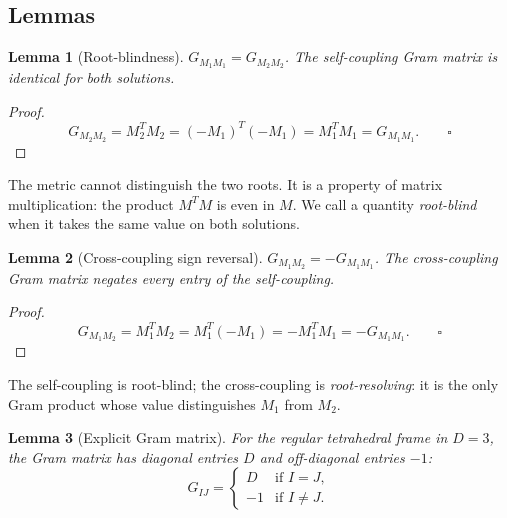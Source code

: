 \documentclass[twocolumn]{iopjournal}
\newtheorem{lemma}{Lemma}
\theoremstyle{definition}
\begin{document}

\subsection*{Lemmas}

\begin{lemma}[Root-blindness]
\label{lem:root_blind}
$G_{M_1 M_1} = G_{M_2 M_2}$.  The self-coupling Gram matrix is
identical for both solutions.
\end{lemma}

\begin{proof}
\begin{equation}
  G_{M_2 M_2} = M_2^T M_2 = (-M_1)^T(-M_1)
  = M_1^T M_1 = G_{M_1 M_1}. \qquad\square
  \label{eq:root_blind}
\end{equation}
\end{proof}

\noindent
The metric cannot distinguish the two roots.  It is a property of
matrix multiplication: the product $M^T M$ is even in $M$.  We call a
quantity \textit{root-blind} when it takes the same value on both
solutions.

\begin{lemma}[Cross-coupling sign reversal]
\label{lem:cross}
$G_{M_1 M_2} = -G_{M_1 M_1}$.  The cross-coupling Gram matrix negates
every entry of the self-coupling.
\end{lemma}

\begin{proof}
\begin{equation}
  G_{M_1 M_2} = M_1^T M_2 = M_1^T(-M_1)
  = -M_1^T M_1 = -G_{M_1 M_1}. \qquad\square
  \label{eq:cross}
\end{equation}
\end{proof}

\noindent
The self-coupling is root-blind; the cross-coupling is
\textit{root-resolving}: it is the only Gram product whose value
distinguishes $M_1$ from $M_2$.

\begin{lemma}[Explicit Gram matrix]
\label{lem:explicit}
For the regular tetrahedral frame in $D = 3$, the Gram matrix has
diagonal entries $D$ and off-diagonal entries $-1$:
\begin{equation}
  G_{IJ} = \begin{cases}
    D & \text{if } I = J, \\
    -1 & \text{if } I \neq J.
  \end{cases}
  \label{eq:explicit_G}
\end{equation}
\end{lemma}
\end{document}
